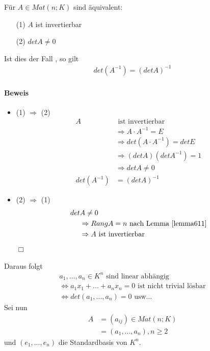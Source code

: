 \documentclass[11pt]{report}
\begin{document}
\begin{satz}
\label{satz621}
Für $A \in Mat(n;K)$ sind äquivalent:
\begin{itemize}
 \item[(1)] $A$ ist invertierbar
 \item[(2)] $det A \neq 0$
\end{itemize}
Ist dies der Fall , so gilt
\begin{align}
det(A^{-1}) = (det A)^{-1}
\end{align}
\end{satz}

\paragraph{Beweis}
\begin{itemize}
\item (1) $\Rightarrow$ (2) 
\begin{align}
A &\text{ ist invertierbar} \\
&\Rightarrow A\cdot A^{-1} = E \\
&\Rightarrow det(A \cdot A^{-1}) = det E \\
&\Rightarrow (det A)(det A^{-1}) = 1 \\
&\Rightarrow  det A \neq 0 \\
det(A^{-1}) &= (det A)^{-1}
\end{align}

\item (2) $\Rightarrow$ (1) 
\begin{align}
det &A \neq 0 \\
&\Rightarrow Rang A = n \text{ nach Lemma \ref{lemma611}} \\
&\Rightarrow A \text{ ist invertierbar}
\end{align}
\hspace*{1cm} \hfill $\Box$
\end{itemize}
Daraus folgt
\begin{align}
a_1, ..., a_n \in K^n \text{ sind linear abhängig} \\
\Leftrightarrow a_1 x_1 + ... + a_n x_n = 0 \text{ ist nicht trivial lösbar} \\
\Leftrightarrow det(a_1, ..., a_n) = 0 \text{ usw...}
\end{align}
Sei nun
\begin{align}
A &= (a_{ij}) \in Mat(n;K) \\
&= (a_1, ..., a_n) , n \geq 2
\end{align}
und $(e_1, ..., e_n)$ die Standardbasis von $K^n$.\\\\
\end{document}
